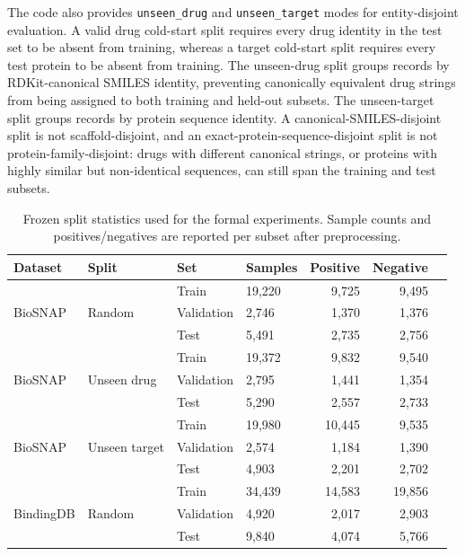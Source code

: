 \documentclass[computers,article,submit,moreauthors]{Definitions/mdpi}
\begin{document}
The code also provides \texttt{unseen\_drug} and \texttt{unseen\_target} modes for entity-disjoint evaluation. A valid drug cold-start split requires every drug identity in the test set to be absent from training, whereas a target cold-start split requires every test protein to be absent from training. The unseen-drug split groups records by RDKit-canonical SMILES identity, preventing canonically equivalent drug strings from being assigned to both training and held-out subsets. The unseen-target split groups records by protein sequence identity. A canonical-SMILES-disjoint split is not scaffold-disjoint, and an exact-protein-sequence-disjoint split is not protein-family-disjoint: drugs with different canonical strings, or proteins with highly similar but non-identical sequences, can still span the training and test subsets.

\begin{table}[H]
\caption{Frozen split statistics used for the formal experiments. Sample counts and positives/negatives are reported per subset after preprocessing.}
\label{tab:dataset}
\scriptsize
\begin{tabular*}{\textwidth}{@{\extracolsep{\fill}}llllrrr@{}}
\toprule
\textbf{Dataset} & \textbf{Split} & \textbf{Set} & \textbf{Samples} & \textbf{Positive} & \textbf{Negative} \\
\midrule
\multirow{3}{*}{BioSNAP} & \multirow{3}{*}{Random} & Train & 19,220 & 9,725 & 9,495 \\
& & Validation & 2,746 & 1,370 & 1,376 \\
& & Test & 5,491 & 2,735 & 2,756 \\
\midrule
\multirow{3}{*}{BioSNAP} & \multirow{3}{*}{Unseen drug} & Train & 19,372 & 9,832 & 9,540 \\
& & Validation & 2,795 & 1,441 & 1,354 \\
& & Test & 5,290 & 2,557 & 2,733 \\
\midrule
\multirow{3}{*}{BioSNAP} & \multirow{3}{*}{Unseen target} & Train & 19,980 & 10,445 & 9,535 \\
& & Validation & 2,574 & 1,184 & 1,390 \\
& & Test & 4,903 & 2,201 & 2,702 \\
\midrule
\multirow{3}{*}{BindingDB} & \multirow{3}{*}{Random} & Train & 34,439 & 14,583 & 19,856 \\
& & Validation & 4,920 & 2,017 & 2,903 \\
& & Test & 9,840 & 4,074 & 5,766 \\
\bottomrule
\end{tabular*}
\end{table}
\end{document}

